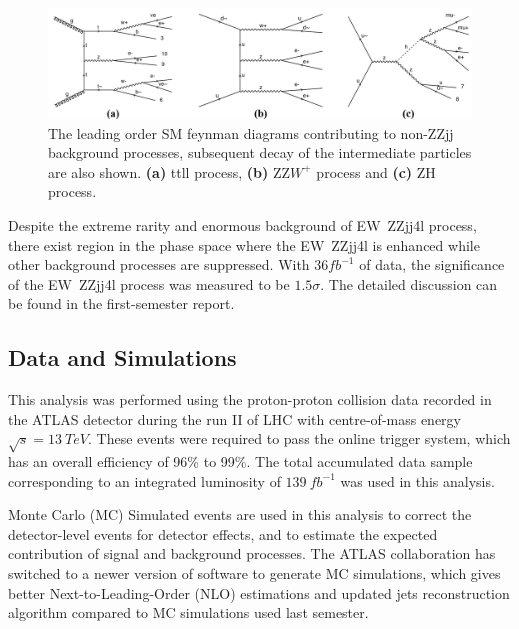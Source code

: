 \documentclass[a4paper,12pt]{article}
\begin{document}
			\begin{figure}[ht]
				\begin{centering}
				\includegraphics[scale=0.42]{figures/feynman_bkg.png}
				\caption{The leading order SM feynman diagrams contributing to non-ZZjj background processes, 
				subsequent decay of the intermediate particles are also shown. 
				\textbf{(a)} ttll process, \textbf{(b)} ZZ$W^{+}$ process and \textbf{(c)} ZH process.}
				\label{fig:feynman_bkg}
				\end{centering}
			\end{figure}
			\par Despite the extreme rarity and enormous background of EW\ ZZjj4l process, there exist region in the phase 
			space where the EW\ ZZjj4l is enhanced while other background processes are suppressed. With $36 fb^{-1}$ of data,
			the significance of the EW\ ZZjj4l process was measured to be $1.5\sigma$. The detailed discussion can be found
			in the first-semester report\cite{last:2020}. 
		\subsection{Data and Simulations}
			\par This analysis was performed using the proton-proton collision data recorded in the ATLAS detector 
			during the run II of LHC with centre-of-mass energy $\sqrt{s} = 13\ TeV$. These events were required 
			to pass the online trigger system\cite{zurNedden:2238679}, which has an overall efficiency of 96\% 
			to 99\%\cite{Aaboud_2019}. The total accumulated data sample corresponding to an integrated luminosity 
			of $139\ fb^{-1}$ was used in this analysis.
			
			\par Monte Carlo (MC) Simulated events\cite{10.5555/3172929} are used in this analysis to correct the 
			detector-level events for detector effects, and to estimate the expected contribution of signal and 
			background processes. The ATLAS collaboration has switched to a newer version of software to generate 
			MC simulations, which gives better Next-to-Leading-Order (NLO) estimations and updated jets reconstruction
			algorithm compared to MC simulations used last semester\cite{last:2020}.
\end{document}
